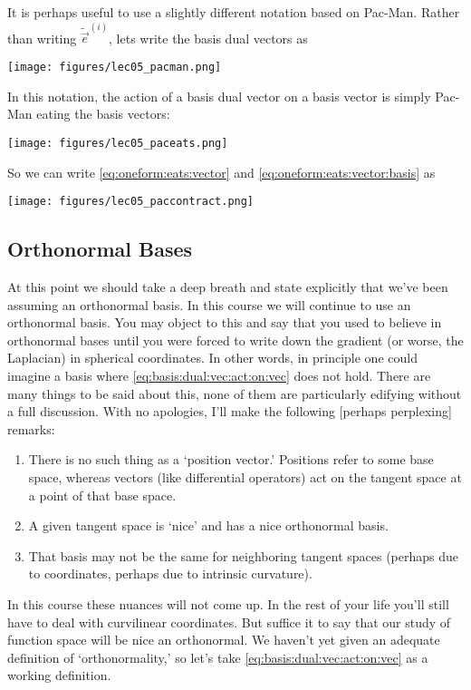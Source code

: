 It is perhaps useful to use a slightly different notation based on Pac-Man. Rather than writing $\tilde{\vec{e}}^{(i)}$, lets write the basis dual vectors as
\begin{center}
\texttt{[image: figures/lec05\_pacman.png]}
\end{center}
In this notation, the action of a basis dual vector on a basis vector is simply Pac-Man eating the basis vectors:
\begin{center}
\texttt{[image: figures/lec05\_paceats.png]}
\end{center}
So we can write \eqref{eq:oneform:eats:vector} and \eqref{eq:oneform:eats:vector:basis} as
\begin{center}
\texttt{[image: figures/lec05\_paccontract.png]}
\end{center}






\subsection{Orthonormal Bases}

At this point we should take a deep breath and state explicitly that we’ve been assuming an orthonormal basis. In this course we will continue to use an orthonormal basis. You may object to this and say that you used to believe in orthonormal bases until you were forced to write down the gradient (or worse, the Laplacian) in spherical coordinates. 
%
In other words, in principle one could imagine a basis where \eqref{eq:basis:dual:vec:act:on:vec} does not hold.
%
There are many things to be said about this, none of them are particularly edifying without a full discussion. With no apologies, I’ll make the following [perhaps perplexing] remarks:
\begin{enumerate}
\item There is no such thing as a `position vector.' Positions refer to some base space, whereas vectors (like differential operators) act on the tangent space at a point of that base space. 
\item A given tangent space is `nice’ and has a nice orthonormal basis. 
\item That basis may not be the same for neighboring tangent spaces (perhaps due to coordinates, perhaps due to intrinsic curvature). 
\end{enumerate}
In this course these nuances will not come up. In the rest of your life you’ll still have to deal with curvilinear coordinates. But suffice it to say that our study of function space will be nice an orthonormal. We haven’t yet given an adequate definition of `orthonormality,’ so let's take \eqref{eq:basis:dual:vec:act:on:vec} as a working definition.





